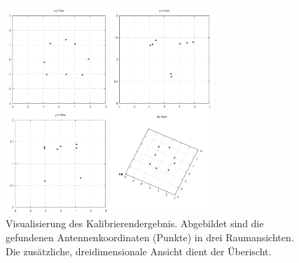 \begin{figure}[ht!]
         \centering
         \includegraphics[width=0.7\textwidth]{img/calibration/calibration_results.png}
         \caption[Visualisierung des Kalibrierendergebnis]{Visualisierung des Kalibrierendergebnis. Abgebildet sind die gefundenen Antennenkoordinaten (Punkte) in drei Raumansichten. Die zusätzliche, dreidimensionale  Ansicht dient der Überischt.}
         \label{fig:3dplot_coordinates}
%
\end{figure}
%
